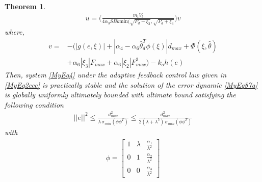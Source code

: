 \documentclass{article} %
\newtheorem{theorem}{Theorem}
\begin{document}
\begin{theorem}
\begin{equation}
\begin{split}
  u=\bigg(\tfrac{m_tV_t}{4\alpha_3SBk \text{min}(\sqrt{P_d-\xi_3},\sqrt{P_d+\xi_3}}\bigg)v
  \end{split}
\end{equation}
where,
\begin{equation}
  \begin{split}
  v=&-(|g(e,\xi)|+|\alpha_4-\alpha_6{\hat \theta}^T_d\phi(\xi)|d_{max}+\Phi(\xi,\hat \theta)\\
    &+\alpha_6|\xi_3|F_{max}+\alpha_6|\xi_2|F^3_{max})-k_oh(e)
  \end{split}
\end{equation}
Then, system \eqref{MyEq4} under the adaptive feedback control law given in \eqref{MyEq2ccc} is practically stable and the solution of the error dynamic \eqref{MyEq87a} is globally uniformly ultimately bounded with ultimate bound satisfying the following condition
\begin{equation}
  \begin{split}
||e||^2 \leq \frac{d_{max}^2}{\lambda\,\sigma_{min}(\phi \phi^T)}\leq\frac{d_{max}^2}{2 \left(\lambda+\lambda^{5}\right)\,\sigma_{min}(\phi \phi^T)}
\end{split}
\end{equation}
with
\begin{equation} \label{phi2}
  \begin{split}
\phi = \left[ \begin{array}{lll} 1&\lambda&\frac{\alpha_1}{\lambda^2}\\ 0 & 1 & \frac{\alpha_2}{\lambda^2}\\ 0& 0&\frac{\alpha_3}{\lambda^2} \end{array}\right]
\end{split}
\end{equation}
\end{theorem}
\end{document}
